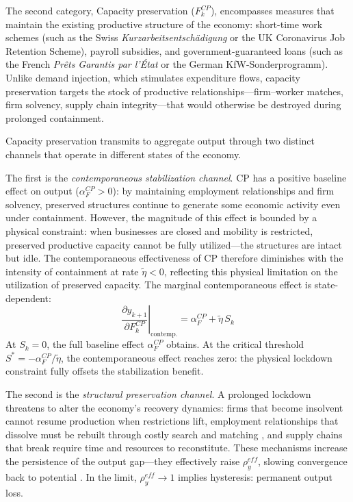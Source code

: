 

The second category, Capacity preservation ($F^{CP}_k$), encompasses measures that maintain the existing productive structure of the economy: short-time work schemes (such as the Swiss \textit{Kurzarbeitsentschädigung} or the UK Coronavirus Job Retention Scheme), payroll subsidies, and government-guaranteed loans (such as the French \textit{Pr\^ets Garantis par l'\'{E}tat} or the German KfW-Sonderprogramm). Unlike demand injection, which stimulates expenditure flows, capacity preservation targets the stock of productive relationships---firm--worker matches, firm solvency, supply chain integrity---that would otherwise be destroyed during prolonged containment.

Capacity preservation transmits to aggregate output through two distinct channels that operate in different states of the economy.

The first is the \textit{contemporaneous stabilization channel}. CP has a positive baseline effect on output ($\alpha^{CP}_F > 0$): by maintaining employment relationships and firm solvency, preserved structures continue to generate some economic activity even under containment. However, the magnitude of this effect is bounded by a physical constraint: when businesses are closed and mobility is restricted, preserved productive capacity cannot be fully utilized---the structures are intact but idle. The contemporaneous effectiveness of CP therefore diminishes with the intensity of containment at rate $\tilde{\eta} < 0$, reflecting this physical limitation on the utilization of preserved capacity. The marginal contemporaneous effect is state-dependent:
%
\begin{equation}
    \left.\frac{\partial y_{k+1}}{\partial F^{CP}_k}\right|_{\text{contemp.}} = \alpha^{CP}_F + \tilde{\eta}\, S_k
    \label{eq:cp_contemp}
\end{equation}
%
At $S_k = 0$, the full baseline effect $\alpha^{CP}_F$ obtains. At the critical threshold $S^* = -\alpha^{CP}_F / \tilde{\eta}$, the contemporaneous effect reaches zero: the physical lockdown constraint fully offsets the stabilization benefit. 

The second is the \textit{structural preservation channel}. A prolonged lockdown threatens to alter the economy's recovery dynamics: firms that become insolvent cannot resume production when restrictions lift, employment relationships that dissolve must be rebuilt through costly search and matching \citep{Fujita2024}, and supply chains that break require time and resources to reconstitute. These mechanisms increase the persistence of the output gap---they effectively raise $\rho^{eff}_y$, slowing convergence back to potential \citep{Kozlowski2020, Cerra2020}. In the limit, $\rho^{eff}_y \to 1$ implies hysteresis: permanent output loss.

